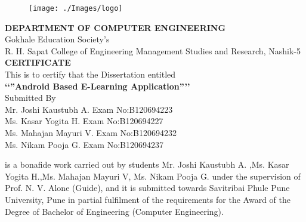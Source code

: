\documentclass[oneside,a4paper,12pt]{report}
\begin{document}
\newpage
{}
\begin{center}
\begin{figure}[!h]
\centering
\texttt{[image: ./Images/logo]}
\end{figure}
\textbf{DEPARTMENT OF COMPUTER ENGINEERING} \\
Gokhale Education Society's \\
R. H. Sapat College of Engineering Management Studies and Research, Nashik-5 \\
\vspace*{0.2in}
{\huge \bf CERTIFICATE}\\
\vspace*{0.2in}
{\large This is to certify that the Dissertation entitled} \\
\vspace*{0.1in}
{\large \bf \lq \lq ”Android Based E-Learning Application”\rq \rq} \\
\vspace*{0.1in}
Submitted By \\
\vspace*{0.1in}
Mr. Joshi Kaustubh A.  \hspace{26 mm} Exam No:B120694223\\
Ms. Kasar Yogita H.
\hspace{32 mm}Exam No:B120694227\\
Ms. Mahajan Mayuri V. \hspace{24 mm} Exam No:B120694232\\
Ms. Nikam Pooja G. \hspace{31 mm} Exam No:B120694237\\
\end{center}

\vspace*{0.1in}
is a bonafide work carried out by students Mr. Joshi Kaustubh A. ,Ms. Kasar Yogita H.,Ms. Mahajan Mayuri V, Ms. Nikam Pooja G. under the supervision of Prof. N. V. Alone (Guide), and it is submitted towards Savitribai Phule Pune University, Pune in partial fulfilment of the requirements for the Award of the Degree of Bachelor of Engineering (Computer Engineering).\\
\end{document}
